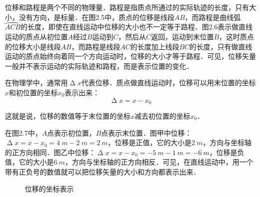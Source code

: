 位移和路程是两个不同的物理量．路程是指质点所通过的实际轨迹的长度，只有大小，没有方向，是标量．在图2.5中，质点的位移是线段$AB$，而路程是曲线弧$\wideparen{ACB}$的长度，即使在直线运动中位移的大小也不一定等于路程．图2.6表示做直线运动的质点从初位置$A$经过$B$运动到$C$，然后从$C$返回，运动到末位置$B$，这时质点的位移大小是线段$AB$，而路程是线段$AC$的长度加上线段$BC$的长度，只有做直线运动的质点始终向着同一个方向运动时，位移的大小才等于路程．可见，位移矢量一般并不表示运动的实际轨迹和路程，而是表示位置的变化．
\begin{figure}[H]
    \centering
    \caption{}
\end{figure}

在物理学中，通常用$\upDelta x$代表位移．质点做直线运动时，位移可以用末位置的坐标$x$和初位置的坐标$x_0$表示出来：
\begin{equation}
    \upDelta x=x-x_0
\end{equation}


这就是说，位移的数值等于末位置的坐标$x$减去初位置的坐标$x_0$．

\newpage
在图2.7中，$A$点表示初位置，$B$点表示末位置．图甲中位移：$\upDelta x=x-x_0=\qty{4}{m}-\qty{2}{m}=\qty{2}{m}$，位移是正值，它的大小是$\qty{2}{m}$，方向与坐标轴的正方向相同．图乙中位移：$\upDelta x=x-x_0=\qty{-5}{m}-\qty{1}{m}=\qty{-6}{m}$，位移是负值，它的大小是$\qty{6}{m}$，方向与坐标轴的正方向相反．可见，在直线运动中，用一个带有正负号的数值就可以把位移矢量的大小和方向都表示出来．

\begin{figure}[H]
    \centering
    \caption{位移的坐标表示}
\end{figure}

